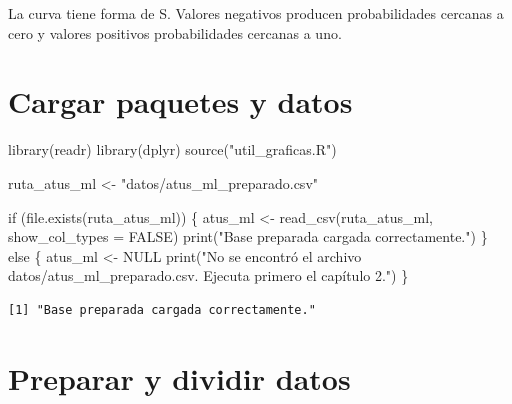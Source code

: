\documentclass[
  spanish,
  11pt,
  letterpaper,
]{book}
\newenvironment{Shaded}{}{}
\newcommand{\AttributeTok}[1]{\textcolor[rgb]{0.84,0.23,0.29}{#1}}
\newcommand{\ConstantTok}[1]{\textcolor[rgb]{0.00,0.36,0.77}{#1}}
\newcommand{\ControlFlowTok}[1]{\textcolor[rgb]{0.84,0.23,0.29}{#1}}
\newcommand{\FunctionTok}[1]{\textcolor[rgb]{0.44,0.26,0.76}{#1}}
\newcommand{\NormalTok}[1]{\textcolor[rgb]{0.14,0.16,0.18}{#1}}
\newcommand{\OtherTok}[1]{\textcolor[rgb]{0.44,0.26,0.76}{#1}}
\newcommand{\StringTok}[1]{\textcolor[rgb]{0.01,0.18,0.38}{#1}}
\begin{document}
\begin{tcolorbox}[enhanced jigsaw, arc=.35mm, bottomrule=.15mm, bottomtitle=1mm, breakable, colback=white, colbacktitle=quarto-callout-tip-color!10!white, colframe=quarto-callout-tip-color-frame, coltitle=black, left=2mm, leftrule=.75mm, opacityback=0, opacitybacktitle=0.6, rightrule=.15mm, title=\textcolor{quarto-callout-tip-color}{\faLightbulb}\hspace{0.5em}{Interpretación del resultado}, titlerule=0mm, toprule=.15mm, toptitle=1mm]

La curva tiene forma de S. Valores negativos producen probabilidades
cercanas a cero y valores positivos probabilidades cercanas a uno.

\end{tcolorbox}

\section{Cargar paquetes y datos}\label{cargar-paquetes-y-datos}

\begin{Shaded}
\begin{Highlighting}[]
\FunctionTok{library}\NormalTok{(readr)}
\FunctionTok{library}\NormalTok{(dplyr)}
\FunctionTok{source}\NormalTok{(}\StringTok{"util\_graficas.R"}\NormalTok{)}

\NormalTok{ruta\_atus\_ml }\OtherTok{\textless{}{-}} \StringTok{"datos/atus\_ml\_preparado.csv"}

\ControlFlowTok{if}\NormalTok{ (}\FunctionTok{file.exists}\NormalTok{(ruta\_atus\_ml)) \{}
\NormalTok{  atus\_ml }\OtherTok{\textless{}{-}} \FunctionTok{read\_csv}\NormalTok{(ruta\_atus\_ml, }\AttributeTok{show\_col\_types =} \ConstantTok{FALSE}\NormalTok{)}
  \FunctionTok{print}\NormalTok{(}\StringTok{"Base preparada cargada correctamente."}\NormalTok{)}
\NormalTok{\} }\ControlFlowTok{else}\NormalTok{ \{}
\NormalTok{  atus\_ml }\OtherTok{\textless{}{-}} \ConstantTok{NULL}
  \FunctionTok{print}\NormalTok{(}\StringTok{"No se encontró el archivo datos/atus\_ml\_preparado.csv. Ejecuta primero el capítulo 2."}\NormalTok{)}
\NormalTok{\}}
\end{Highlighting}
\end{Shaded}

\begin{verbatim}
[1] "Base preparada cargada correctamente."
\end{verbatim}

\section{Preparar y dividir datos}\label{preparar-y-dividir-datos}
\end{document}
